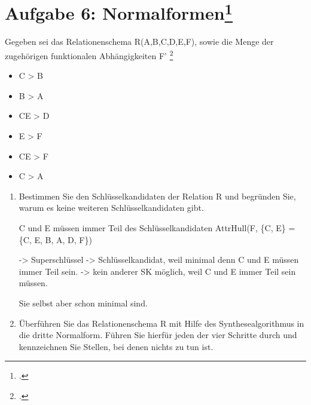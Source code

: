 \documentclass{lehramt-informatik-aufgabe}
\begin{document}

\section{Aufgabe 6: Normalformen\footcite{examen:66116:2018:03}}

Gegeben sei das Relationenschema R(A,B,C,D,E,F), sowie die Menge der
zugehörigen funktionalen Abhängigkeiten F' \footcite{db:pu:wh}

\begin{itemize}
\item \liFA C > B
\item \liFA B > A
\item \liFA CE > D
\item \liFA E > F
\item \liFA CE > F
\item \liFA C > A
\end{itemize}

\begin{enumerate}
\item Bestimmen Sie den Schlüsselkandidaten der Relation R und begründen
Sie, warum es keine weiteren Schlüsselkandidaten gibt.

\begin{antwort}
 C und E müssen immer Teil des Schlüsselkandidaten
AttrHull(F, \{C, E\} = \{C, E, B, A, D, F\})

-> Superschlüssel
-> Schlüsselkandidat, weil minimal denn C und E müssen immer Teil sein.
-> kein anderer SK möglich, weil C und E immer Teil sein müssen.

Sie selbst aber schon minimal sind.
\end{antwort}

\item Überführen Sie das Relationenschema R mit Hilfe des
Synthesealgorithmus in die dritte
Normalform. Führen Sie hierfür jeden der vier
Schritte durch und kennzeichnen Sie Stellen, bei denen nichts zu tun
ist.
\end{enumerate}
\end{document}
